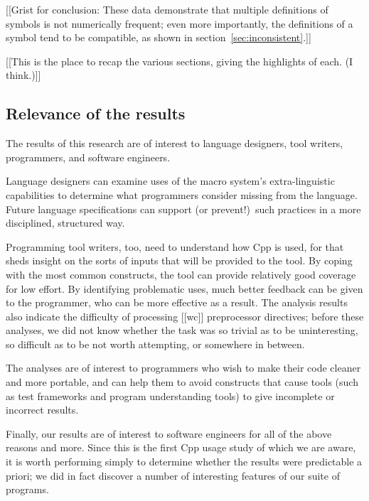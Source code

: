 \documentclass[10pt]{article}
\begin{document}
[[Grist for conclusion: These data demonstrate that multiple definitions of
symbols is not numerically frequent; even more importantly, the definitions
of a symbol tend to be compatible, as shown in
section~\ref{sec:inconsistent}.]]


[[This is the place to recap the various sections, giving the highlights of
each.  (I think.)]]

\subsection{Relevance of the results}

The results of this research are of interest to language designers, tool
writers, programmers, and software engineers.

Language designers can examine uses of the macro system's extra-linguistic
capabilities to determine what programmers consider missing from the
language.  Future language specifications can support (or prevent!)\ such
practices in a more disciplined, structured way.


Programming tool writers, too, need to understand how Cpp is used, for that
sheds insight on the sorts of inputs that will be provided to the tool.  By
coping with the most common constructs, the tool can provide relatively
good coverage for low effort.  By identifying problematic uses, much better
feedback can be given to the programmer, who can be more effective as a
result.  The analysis results also indicate the difficulty of processing [[wc]]
preprocessor directives; before these analyses, we did not know whether the
task was so trivial as to be uninteresting, so difficult as to be not worth
attempting, or somewhere in between.

The analyses are of interest to programmers who wish to make their code
cleaner and more portable, and can help them to avoid constructs that cause
tools (such as test frameworks and program understanding tools)
to give incomplete or incorrect results.


Finally, our results are of interest to software engineers for all of the
above reasons and more.  Since this is the first Cpp usage study of which
we are aware, it is worth performing simply to determine whether the
results were predictable a priori; we did in fact discover a number of
interesting features of our suite of programs.
\end{document}
